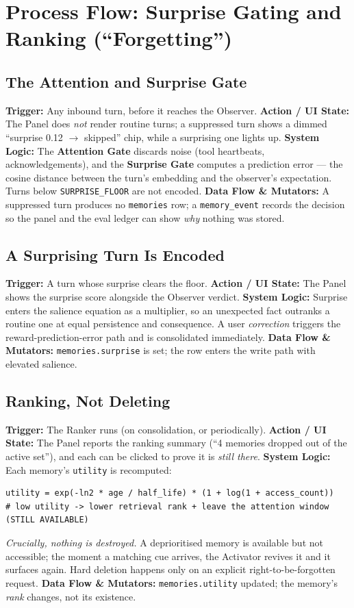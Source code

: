 \chapter{Process Flow: Surprise Gating and Ranking (``Forgetting'')}

\section{The Attention and Surprise Gate}
\textbf{Trigger:} Any inbound turn, before it reaches the Observer.
\textbf{Action / UI State:} The Panel does \emph{not} render routine turns; a suppressed turn shows a
dimmed ``surprise 0.12 $\rightarrow$ skipped'' chip, while a surprising one lights up.
\textbf{System Logic:} The \textbf{Attention Gate} discards noise (tool heartbeats, acknowledgements),
and the \textbf{Surprise Gate} computes a prediction error --- the cosine distance between the turn's
embedding and the observer's expectation. Turns below \texttt{SURPRISE\_FLOOR} are not encoded.
\textbf{Data Flow \& Mutators:} A suppressed turn produces no \texttt{memories} row; a
\texttt{memory\_event} records the decision so the panel and the eval ledger can show \emph{why}
nothing was stored.

\section{A Surprising Turn Is Encoded}
\textbf{Trigger:} A turn whose surprise clears the floor.
\textbf{Action / UI State:} The Panel shows the surprise score alongside the Observer verdict.
\textbf{System Logic:} Surprise enters the salience equation as a multiplier, so an unexpected fact
outranks a routine one at equal persistence and consequence. A user \emph{correction} triggers the
reward-prediction-error path and is consolidated immediately.
\textbf{Data Flow \& Mutators:} \texttt{memories.surprise} is set; the row enters the write path with
elevated salience.

\section{Ranking, Not Deleting}
\textbf{Trigger:} The Ranker runs (on consolidation, or periodically).
\textbf{Action / UI State:} The Panel reports the ranking summary (``4 memories dropped out of the
active set''), and each can be clicked to prove it is \emph{still there}.
\textbf{System Logic:} Each memory's \texttt{utility} is recomputed:
\begin{Verbatim}[breaklines=true,fontsize=\small]
utility = exp(-ln2 * age / half_life) * (1 + log(1 + access_count))
# low utility -> lower retrieval rank + leave the attention window (STILL AVAILABLE)
\end{Verbatim}
\emph{Crucially, nothing is destroyed.} A deprioritised memory is available but not accessible; the
moment a matching cue arrives, the Activator revives it and it surfaces again. Hard deletion happens
only on an explicit right-to-be-forgotten request.
\textbf{Data Flow \& Mutators:} \texttt{memories.utility} updated; the memory's \emph{rank} changes,
not its existence.

